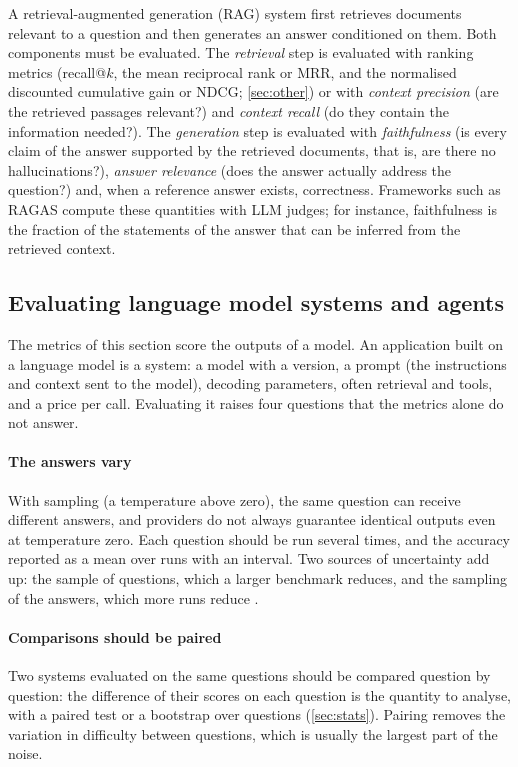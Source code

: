A retrieval-augmented generation (RAG) system first retrieves documents relevant to a question
and then generates an answer conditioned on them. Both components must be evaluated. The
\emph{retrieval} step is evaluated with ranking metrics (recall@$k$, the mean reciprocal rank or MRR, and the normalised discounted cumulative gain or NDCG; \cref{sec:other}) or with
\emph{context precision} (are the retrieved passages relevant?) and \emph{context recall} (do
they contain the information needed?). The \emph{generation} step is evaluated with
\emph{faithfulness} (is every claim of the answer supported by the retrieved documents, that is,
are there no hallucinations?), \emph{answer relevance} (does the answer actually address the
question?) and, when a reference answer exists, correctness. Frameworks such as RAGAS
\citep{es2024ragas} compute these quantities with LLM judges; for instance, faithfulness is the
fraction of the statements of the answer that can be inferred from the retrieved context.

\subsection{Evaluating language model systems and agents}\label{sec:llmsystems}

The metrics of this section score the outputs of a model. An application built on a language
model is a system: a model with a version, a prompt (the instructions and context sent to the model), decoding parameters, often retrieval and
tools, and a price per call. Evaluating it raises four questions that the metrics alone do not
answer.

\paragraph{The answers vary} With sampling (a temperature above zero), the same question can receive
different answers, and providers do not always guarantee identical outputs even at temperature zero.
Each question should be run several times, and the accuracy reported as a mean over runs with an
interval. Two sources of uncertainty add up: the sample of questions, which a larger benchmark
reduces, and the sampling of the answers, which more runs reduce \citep{miller2024adding}.

\paragraph{Comparisons should be paired} Two systems evaluated on the same questions should be
compared question by question: the difference of their scores on each question is the quantity to
analyse, with a paired test or a bootstrap over questions (\cref{sec:stats}). Pairing removes the
variation in difficulty between questions, which is usually the largest part of the noise.

